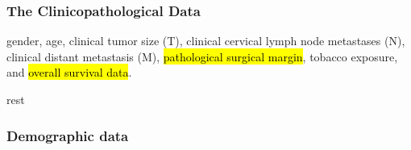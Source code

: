 \documentclass[
paper=landscape,
paper=160mm:90mm, %
fontsize=11pt, %
pagesize, %
parskip=half-, %
]{scrartcl} %
\theoremstyle{mythmstyle} %
\begin{document}
\subsubsection{The Clinicopathological Data}
gender, age, clinical tumor size (T), clinical cervical lymph node metastases (N), clinical distant metastasis (M), \hl{pathological surgical margin}, tobacco exposure, and \hl{overall survival data}.

\tiny * \acrfull{rest}

\clearpage
\subsubsection*{Demographic data}
\begin{table}[H]
\centering
\end{table}

\clearpage
\end{document}

